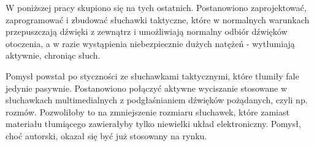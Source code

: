 W poniższej pracy skupiono się na tych ostatnich. Postanowiono zaprojektować, zaprogramować i zbudować słuchawki taktyczne, które w normalnych warunkach przepuszczają dźwięki z zewnątrz i umożliwiają normalny odbiór dźwięków otoczenia, a w razie wystąpienia niebezpiecznie dużych natężeń - wytłumiają aktywnie, chroniąc słuch.

Pomysł powstał po styczności ze słuchawkami taktycznymi, które tłumiły fale jedynie pasywnie. Postanowiono połączyć aktywne wyciszanie stosowane w słuchawkach multimedialnych z podgłaśnianiem dźwięków pożądanych, czyli np. rozmów. Pozwoliłoby to na zmniejszenie rozmiaru słuchawek, które zamiast materiału tłumiącego zawierałyby tylko niewielki układ elektroniczny. Pomysł, choć autorski, okazał się być już stosowany na rynku.